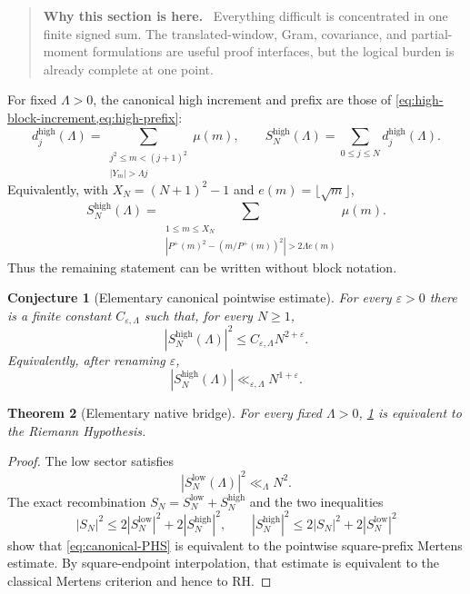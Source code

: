 \documentclass[11pt]{article}
\newtheorem{theorem}{Theorem}[section]
\newtheorem{conjecture}[theorem]{Conjecture}
\theoremstyle{definition}
\theoremstyle{remark}
\newcommand{\eps}{\varepsilon}
\newcommand{\Pplus}{P^{+}}
\newcommand{\1}{\mathbf{1}}
\newenvironment{motivation}
  {\begin{quote}\small\color{ovvogray}\textbf{Why this section is here.}\ }
  {\end{quote}}
\begin{document}
\begin{motivation}
Everything difficult is concentrated in one finite signed sum.  The translated-window, Gram, covariance, and partial-moment formulations are useful proof interfaces, but the logical burden is already complete at one point.
\end{motivation}

For fixed $\Lambda>0$, the canonical high increment and prefix are those of
\cref{eq:high-block-increment,eq:high-prefix}:
\[
 d_j^{\mathrm{high}}(\Lambda)
 =
 \sum_{\substack{j^2\le m<(j+1)^2\\|Y_m|>\Lambda j}}\mu(m),
 \qquad
 S_N^{\mathrm{high}}(\Lambda)
 =\sum_{0\le j\le N}d_j^{\mathrm{high}}(\Lambda).
\]
Equivalently, with $X_N=(N+1)^2-1$ and $e(m)=\lfloor\sqrt m\rfloor$,
\begin{equation}
 \boxed{
 S_N^{\mathrm{high}}(\Lambda)
 =
 \sum_{\substack{1\le m\le X_N\\
 |\Pplus(m)^2-(m/\Pplus(m))^2|>2\Lambda e(m)}}\mu(m).
 }
 \label{eq:high-single-finite-sum}
\end{equation}
Thus the remaining statement can be written without block notation.

\begin{conjecture}[Elementary canonical pointwise estimate]
\label{conj:canonical-PHS}
For every $\eps>0$ there is a finite constant $C_{\eps,\Lambda}$ such that, for every $N\ge1$,
\begin{equation}
 \boxed{
 \left|S_N^{\mathrm{high}}(\Lambda)\right|^2
 \le C_{\eps,\Lambda}N^{2+\eps}.
 }
 \tag{PHS}
 \label{eq:canonical-PHS}
\end{equation}
Equivalently, after renaming $\eps$,
\begin{equation}
 \left|S_N^{\mathrm{high}}(\Lambda)\right|
 \ll_{\eps,\Lambda}N^{1+\eps}.
 \label{eq:canonical-PHS-linear}
\end{equation}
\end{conjecture}

\begin{theorem}[Elementary native bridge]
\label{thm:canonical-PHS-iff-RH}
For every fixed $\Lambda>0$, \cref{conj:canonical-PHS} is equivalent to the Riemann Hypothesis.
\end{theorem}

\begin{proof}
The low sector satisfies
\[
 |S_N^{\mathrm{low}}(\Lambda)|^2
 \ll_\Lambda N^2.
\]
The exact recombination $S_N=S_N^{\mathrm{low}}+S_N^{\mathrm{high}}$ and the two inequalities
\[
 |S_N|^2\le2|S_N^{\mathrm{low}}|^2+2|S_N^{\mathrm{high}}|^2,
 \qquad
 |S_N^{\mathrm{high}}|^2\le2|S_N|^2+2|S_N^{\mathrm{low}}|^2
\]
show that \cref{eq:canonical-PHS} is equivalent to the pointwise square-prefix Mertens estimate.  By square-endpoint interpolation, that estimate is equivalent to the classical Mertens criterion and hence to RH.
\end{proof}
\end{document}
